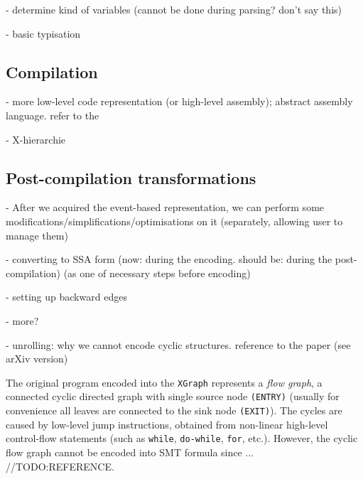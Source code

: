 - determine kind of variables (cannot be done during parsing? don't say this)

- basic typisation


\subsection{Compilation}
\label{ch:impl:y2x:compil}

- more low-level code representation (or high-level assembly); abstract assembly language. refer to the %

- X-hierarchie


\subsection{Post-compilation transformations}
\label{ch:impl:x2y:postcomp}

- After we acquired the event-based representation, we can perform some modifications/simplifications/optimisations on it (separately, allowing user to manage them)

- converting to SSA form (now: during the encoding. should be: during the post-compilation) (as one of necessary steps before encoding)

- setting up backward edges

- more?

- unrolling: why we cannot encode cyclic structures. reference to the paper (see arXiv version)

The original program encoded into the \texttt{XGraph} represents a \textit{flow graph}, a connected cyclic directed graph with single source node \texttt{(ENTRY)} (usually for convenience all leaves are connected to the sink node \texttt{(EXIT)}). The cycles are caused by low-level jump instructions, obtained from non-linear high-level control-flow statements (such as \texttt{while}, \texttt{do-while}, \texttt{for}, etc.). However, the cyclic flow graph cannot be encoded into SMT formula since ...
//TODO:REFERENCE.%



